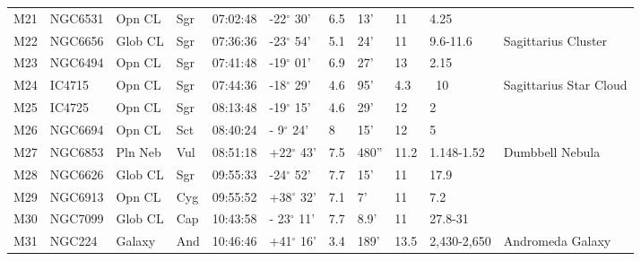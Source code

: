 \documentclass[10pt,twoside,a4paper,english]{article}
\begin{document}
\begin{longtable}{@{}lllllllllll@{}}
M21        & NGC6531     & Opn CL     & Sgr       & 07:02:48 & -22$^{\circ}$ 30'  & 6.5       & 13'                  & 11       & 4.25                &                                           \\ 
M22        & NGC6656     & Glob CL    & Sgr       & 07:36:36 & -23$^{\circ}$ 54'  & 5.1       & 24'                  & 11       & 9.6-11.6            & Sagittarius Cluster                       \\ 
M23        & NGC6494     & Opn CL     & Sgr       & 07:41:48 & -19$^{\circ}$ 01'  & 6.9       & 27'                  & 13       & 2.15                &                                           \\ 
M24        & IC4715      & Opn CL     & Sgr       & 07:44:36 & -18$^{\circ}$ 29'  & 4.6       & 95'                  & 4.3      & ~10                 & Sagittarius Star Cloud                    \\ 
M25        & IC4725      & Opn CL     & Sgr       & 08:13:48 & -19$^{\circ}$ 15'  & 4.6       & 29'                  & 12       & 2                   &                                           \\ 
M26        & NGC6694     & Opn CL     & Sct       & 08:40:24 & - 9$^{\circ}$ 24'  & 8         & 15'                  & 12       & 5                   &                                           \\ 
M27        & NGC6853     & Pln Neb    & Vul       & 08:51:18 & +22$^{\circ}$ 43'  & 7.5       & 480''                & 11.2     & 1.148-1.52          & Dumbbell Nebula                           \\ 
M28        & NGC6626     & Glob CL    & Sgr       & 09:55:33 & -24$^{\circ}$ 52'  & 7.7       & 15'                  & 11       & 17.9                &                                           \\ 
M29        & NGC6913     & Opn CL     & Cyg       & 09:55:52 & +38$^{\circ}$ 32'  & 7.1       & 7'                   & 11       & 7.2                 &                                           \\ 
M30        & NGC7099     & Glob CL    & Cap       & 10:43:58 & - 23$^{\circ}$ 11' & 7.7       & 8.9'                 & 11       & 27.8-31             &                                           \\ 
M31        & NGC224      & Galaxy     & And       & 10:46:46 & +41$^{\circ}$ 16'  & 3.4       & 189'                 & 13.5     & 2,430-2,650         & Andromeda Galaxy                          \\ 

\end{longtable}
\end{document}
